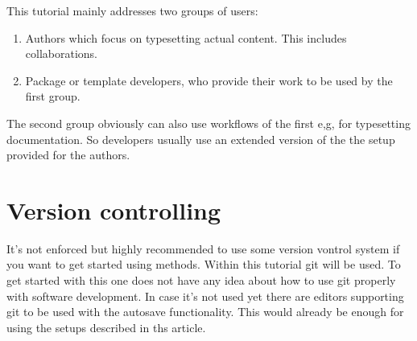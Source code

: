 \documentclass[final]{ltugboat}
\begin{document}
This tutorial mainly addresses two groups of users:

\begin{enumerate}
\item Authors which focus on typesetting actual content. This includes collaborations.
\item Package or template developers, who provide their work to be used by the first group.
\end{enumerate}
The second group obviously can also  use workflows of the first e,g, for typesetting documentation.
So developers usually use an extended version of the the setup provided for the authors. 




\section{Version controlling}
It's not enforced but highly recommended to use some version vontrol system if you want to get started using  methods.
Within this tutorial git \cite{git} will be used.
To get started with this one does not have any idea about how to use git properly with software development.
In case it's not used yet there are editors supporting git to be used with the autosave functionality.
This would already be enough for using the setups described in ths article.

\def\url{\tbsurl}


\makesignature
\end{document}
